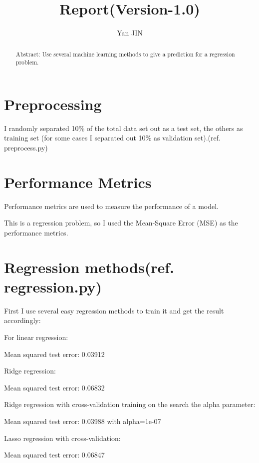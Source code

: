 \documentclass[12pt]{article}
\numberwithin{equation}{section}
\begin{document}
\small
  \renewcommand\figurename{Fig.}
    \title{Report(Version-1.0)}
    \author{Yan JIN}
    \pagestyle{fancy}\fancyhf{}
    \lhead{}
    \cfoot{}\rfoot{\thepage}
    \renewcommand{\headrulewidth}{1.pt}
    \renewcommand{\footrulewidth}{1.pt}
  \maketitle
  \begin{abstract}
	Abstract: Use several machine learning methods to give a prediction for a regression problem. 
  \end{abstract}
  

\section{Preprocessing}
I randomly separated 10\% of the total data set out as a test set, the others as training set (for some cases I separated out 10\% as validation set).(ref. preprocess.py)

\section{Performance Metrics}

Performance metrics are used to measure the performance of a model.

This is a regression problem, so I used the Mean-Square Error (MSE) as the performance metrics. 

\section{Regression methods(ref. regression.py)}
First I use several easy regression methods to train it and get the result accordingly:

For linear regression:

Mean squared test error: 0.03912

Ridge regression:

Mean squared test error: 0.06832

Ridge regression with cross-validation training on the search the alpha parameter:

Mean squared test error: 0.03988
with alpha=1e-07

Lasso regression with cross-validation:

Mean squared test error: 0.06847
\end{document}

